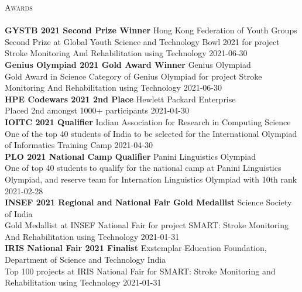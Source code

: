 \documentclass[a4paper]{article}
\newcommand{\lineunder} {
    \vspace*{-8pt} \\
    \hspace*{-18pt} \hrulefill \\
}
\newcommand{\header} [1] {
    {\hspace*{-18pt}\vspace*{6pt} \textsc{#1}}
    \vspace*{-6pt} \lineunder
}
\begin{document}
\header{Awards}
\textbf{GYSTB 2021 Second Prize Winner} \hfill Hong Kong Federation of Youth Groups\\
Second Prize at Global Youth Science and Technology Bowl 2021 for project \textquotedbl{}Stroke Monitoring And Rehabilitation using Technology\textquotedbl{} \hfill 2021-06-30\\
\vspace*{2mm}
\textbf{Genius Olympiad 2021 Gold Award Winner} \hfill Genius Olympiad\\
Gold Award in Science Category of Genius Olympiad for project \textquotedbl{}Stroke Monitoring And Rehabilitation using Technology\textquotedbl{} \hfill 2021-06-30\\
\vspace*{2mm}
\textbf{HPE Codewars 2021 2nd Place} \hfill Hewlett Packard Enterprise\\
Placed 2nd amongst 1000+ participants \hfill 2021-04-30\\
\vspace*{2mm}
\textbf{IOITC 2021 Qualifier} \hfill Indian Association for Research in Computing Science\\
One of the top 40 students of India to be selected for the International Olympiad of Informatics Training Camp \hfill 2021-04-30\\
\vspace*{2mm}
\textbf{PLO 2021 National Camp Qualifier} \hfill Panini Linguistics Olympiad\\
One of top 40 students to qualify for the national camp at Panini Linguistics Olympiad, and reserve team for Internation Linguistics Olympiad with 10th rank \hfill 2021-02-28\\
\vspace*{2mm}
\textbf{INSEF 2021 Regional and National Fair Gold Medallist} \hfill Science Society of India\\
Gold Medallist at INSEF National Fair for project \textquotedbl{}SMART: Stroke Monitoring And Rehabilitation using Technology\textquotedbl{} \hfill 2021-01-31\\
\vspace*{2mm}
\textbf{IRIS National Fair 2021 Finalist} \hfill Exstemplar Education Foundation, Department of Science and Technology India\\
Top 100 projects at IRIS National Fair for \textquotedbl{}SMART: Stroke Monitoring and Rehabilitation using Technology\textquotedbl{} \hfill 2021-01-31\\
\vspace*{2mm}
\end{document}
